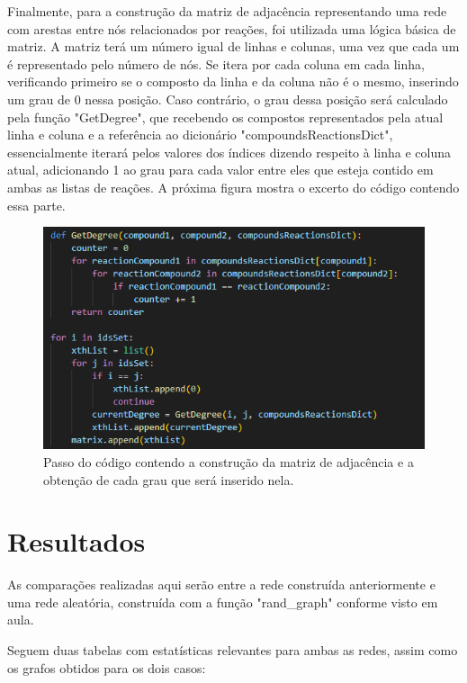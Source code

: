 \documentclass[brazilian,12pt,a4paper,final]{article}
\begin{document}
	Finalmente, para a construção da matriz de adjacência representando uma rede com arestas entre nós relacionados por reações, foi utilizada uma lógica básica de matriz. A matriz terá um número igual de linhas e colunas, uma vez que cada um é representado pelo número de nós. Se itera por cada coluna em cada linha, verificando primeiro se o composto da linha e da coluna não é o mesmo, inserindo um grau de 0 nessa posição. Caso contrário, o grau dessa posição será calculado pela função "GetDegree", que recebendo os compostos representados pela atual linha e coluna e a referência ao dicionário "compoundsReactionsDict", essencialmente iterará pelos valores dos índices dizendo respeito à linha e coluna atual, adicionando 1 ao grau para cada valor entre eles que esteja contido em ambas as listas de reações. A próxima figura mostra o excerto do código contendo essa parte.
	
	\begin{figure}[hbtp]
		\begin{center}
			\includegraphics[]{Matriz.png}
			\caption{Passo do código contendo a construção da matriz de adjacência e a obtenção de cada grau que será inserido nela.}
			\label{fig}
		\end{center}
	\end{figure}
	
	\section{Resultados}
	
	As comparações realizadas aqui serão entre a rede construída anteriormente e uma rede aleatória, construída com a função "rand\_graph" conforme visto em aula.
	\vspace{0.5cm}
	
	Seguem duas tabelas com estatísticas relevantes para ambas as redes, assim como os grafos obtidos para os dois casos:
	\vspace{6cm}
	
\end{document}

